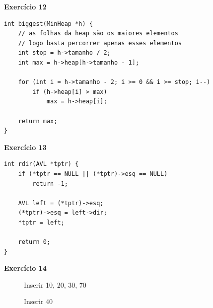 \documentclass[a4paper,11pt]{article}
\begin{document}
\noindent \textbf{Exercício 12}

\begin{verbatim}
int biggest(MinHeap *h) {
	// as folhas da heap são os maiores elementos
	// logo basta percorrer apenas esses elementos
	int stop = h->tamanho / 2;
	int max = h->heap[h->tamanho - 1];
	
	for (int i = h->tamanho - 2; i >= 0 && i >= stop; i--)
		if (h->heap[i] > max)
			max = h->heap[i];
	
	return max;
}
\end{verbatim}

\noindent \textbf{Exercício 13}

\begin{verbatim}
int rdir(AVL *tptr) {
	if (*tptr == NULL || (*tptr)->esq == NULL)
		return -1;
	
	AVL left = (*tptr)->esq;
	(*tptr)->esq = left->dir;
	*tptr = left;
	
	return 0;
}
\end{verbatim}

\newpage

\noindent \textbf{Exercício 14}

\begin{figure}[h]
	\centering
	\caption{Inserir 10, 20, 30, 70}
\end{figure}

\begin{figure}[H]
	\centering
	\caption{Inserir 40}
\end{figure}
\end{document}
